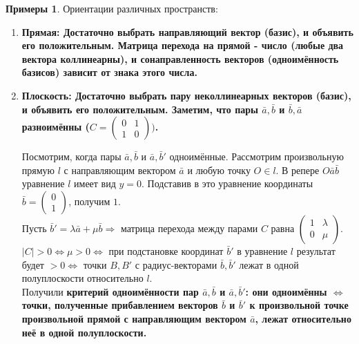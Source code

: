 \documentclass[a4paper, 12pt]{article}
\theoremstyle{definition}
\newtheorem*{examples}{Примеры}
\begin{document}
	\begin{examples} Ориентации различных пространств:
		\begin{enumerate}
			\item \bfseries Прямая\mdseries :
			Достаточно выбрать направляющий вектор (базис), и объявить его положительным. Матрица перехода на прямой - число (любые два вектора коллинеарны), и сонаправленность векторов (одноимённость базисов) зависит от знака этого числа.
			\item  \bfseries Плоскость\mdseries :
			Достаточно выбрать пару неколлинеарных векторов (базис), и объявить его положительным. Заметим, что пары $\bar{a}, \bar{b}$ и $\bar{b}, \bar{a}$ разноимённы ($C = \begin{pmatrix} 0&1\\1&0\end{pmatrix})$.

			Посмотрим, когда пары $\bar{a}, \bar{b}$ и $\bar{a}, \bar{b}'$ одноимённые. Рассмотрим произвольную прямую $l$ с направляющим вектором $\bar{a}$ и любую точку $O \in l$. В репере $O\bar{a}\bar{b}$ уравнение $l$ имеет вид $y = 0$. Подставив в это уравнение координаты $\bar{b} = \begin{pmatrix} 0\\1\end{pmatrix}$, получим $1$.\\
			Пусть $\bar{b}' = \lambda\bar{a} + \mu\bar{b} \Rightarrow$ матрица перехода между парами $C$ равна $\begin{pmatrix} 1&\lambda\\0&\mu\end{pmatrix}$. $|C| > 0 \Leftrightarrow \mu > 0 \Leftrightarrow$ при подстановке координат $\bar{b}'$ в уравнение $l$ результат будет $> 0 \Leftrightarrow$ точки $B, B'$ с радиус-векторами $\bar{b}, \bar{b}'$ лежат в одной полуплоскости относительно $l$.\\
			Получили \bfseries критерий одноимённости пар $\bar{a}, \bar{b}$ и $\bar{a}, \bar{b}'$: они одноимённы $\Leftrightarrow$ точки, полученные прибавлением векторов $\bar{b}$ и $\bar{b}'$ к произвольной точке произвольной прямой с направляющим вектором $\bar{a}$, лежат относительно неё в одной полуплоскости. \mdseries 
		\end{enumerate}
	\end{examples}
\end{document}
